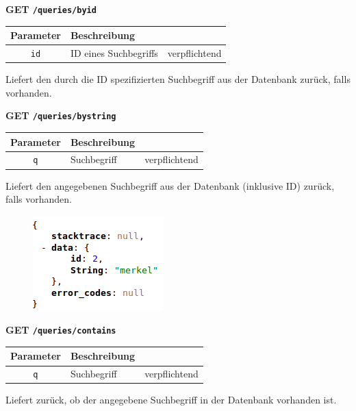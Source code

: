 \noindent
\textbf{GET \texttt{/queries/byid}}
\begin{table}[h!]
\begin{tabular}{| c | p{\tweite} | l |}
\hline
	\textbf{Parameter} & \textbf{Beschreibung} &  \\
\hline \hline
 	\texttt{id} & ID eines Suchbegriffs & verpflichtend \\
\hline
\end{tabular}
\end{table}
\newline
Liefert den durch die ID spezifizierten Suchbegriff aus der Datenbank zurück, falls vorhanden.

\noindent
\textbf{GET \texttt{/queries/bystring}}
\begin{table}[h!]
\begin{tabular}{| c | p{\tweite} | l |}
\hline
	\textbf{Parameter} & \textbf{Beschreibung} &  \\
\hline \hline
 	\texttt{q} & Suchbegriff & verpflichtend \\
\hline
\end{tabular}
\end{table}
\newline
Liefert den angegebenen Suchbegriff aus der Datenbank (inklusive ID) zurück, falls vorhanden.

\begin{figure}[h!]
\includegraphics[scale=0.6]{Bilder/RestApi/queriesByString.png}
\end{figure}

\noindent
\textbf{GET \texttt{/queries/contains}}
\begin{table}[h!]
\begin{tabular}{| c | p{\tweite} | l |}
\hline
	\textbf{Parameter} & \textbf{Beschreibung} &  \\
\hline \hline
 	\texttt{q} & Suchbegriff & verpflichtend \\
\hline
\end{tabular}
\end{table}
\newline
Liefert zurück, ob der angegebene Suchbegriff in der Datenbank vorhanden ist.


